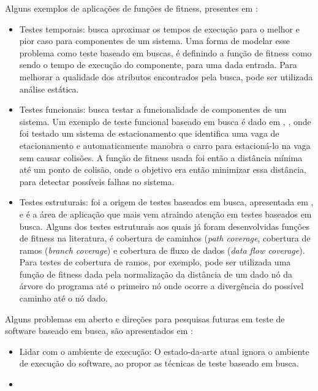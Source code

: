 \documentclass[conference]{IEEEtran}
\begin{document}
Alguns exemplos de aplicações de funções de fitness, presentes em \cite{McMinn:2011}:

\begin{itemize}
\item Testes temporais: busca aproximar os tempos de execução para o melhor e pior caso para componentes de um sistema. Uma forma de modelar esse problema como teste baseado em buscas, é definindo a função de fitness como sendo o tempo de execução do componente, para uma dada entrada. Para melhorar a qualidade dos atributos encontrados pela busca, pode ser utilizada análise estática.

\item Testes funcionais: busca testar a funcionalidade de componentes de um sistema. Um exemplo de teste funcional baseado em busca é dado em \cite{Buhler:2003}, \cite{Buhler:2008}, onde foi testado um sistema de estacionamento que identifica uma vaga de etacionamento e automaticamente manobra o carro para estacioná-lo na vaga sem causar colisões. A função de fitness usada foi então a distância mínima até um ponto de colisão, onde o objetivo era então minimizar essa distância, para detectar possíveis falhas no sistema.

\item Testes estruturais: foi a origem de testes baseados em busca, apresentada em \cite{Miller:1976}, e é a área de aplicação que mais vem atraindo atenção em testes baseados em busca. Alguns dos testes estruturais aos quais já foram desenvolvidas funções de fitness na literatura, é cobertura de caminhos (\emph{path coverage}, cobertura de ramos (\emph{branch coverage}) e cobertura de fluxo de dados (\emph{data flow coverage}). Para testes de cobertura de ramos, por exemplo, pode ser utilizada uma função de fitness dada pela normalização da distância de um dado nó da árvore do programa até o primeiro nó onde ocorre a divergência do possível caminho até o nó dado.
\end{itemize}

Alguns problemas em aberto e direções para pesquisas futuras em teste de software baseado em busca, são apresentados em \cite{McMinn:2011}:

\begin{itemize}
    \item Lidar com o ambiente de execução: O estado-da-arte atual ignora o ambiente de execução do software, ao propor as técnicas de teste baseado em busca. 
    
    \item 
    
\end{itemize}
\end{document}
